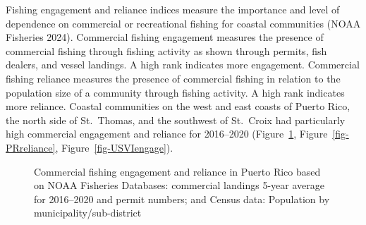 \documentclass[
  letterpaper,
  oneside,
  open=any]{scrbook}
\begin{document}
Fishing engagement and reliance indices measure the importance and level
of dependence on commercial or recreational fishing for coastal
communities (NOAA Fisheries 2024). Commercial fishing engagement
measures the presence of commercial fishing through fishing activity as
shown through permits, fish dealers, and vessel landings. A high rank
indicates more engagement. Commercial fishing reliance measures the
presence of commercial fishing in relation to the population size of a
community through fishing activity. A high rank indicates more reliance.
Coastal communities on the west and east coasts of Puerto Rico, the
north side of St.~Thomas, and the southwest of St.~Croix had
particularly high commercial engagement and reliance for 2016--2020
(Figure~\ref{fig-PRengage}, Figure~\ref{fig-PRreliance},
Figure~\ref{fig-USVIengage}).

\begin{figure}


\caption{\label{fig-PRengage}Commercial fishing engagement and reliance
in Puerto Rico based on NOAA Fisheries Databases: commercial landings
5-year average for 2016--2020 and permit numbers; and Census data:
Population by municipality/sub-district}

\end{figure}%
\end{document}
